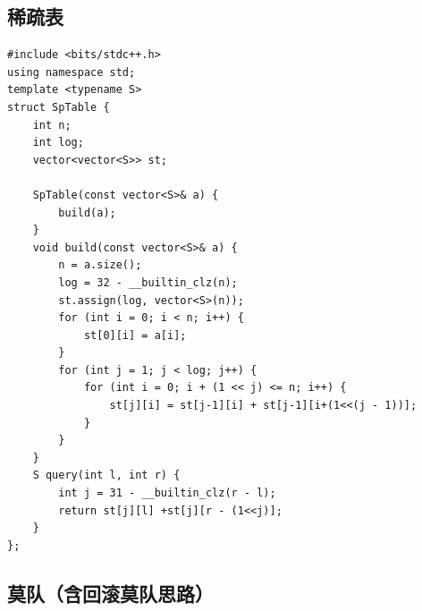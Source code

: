 \subsection{稀疏表}

\begin{lstlisting}
#include <bits/stdc++.h>
using namespace std;
template <typename S>
struct SpTable {
    int n;
    int log;
    vector<vector<S>> st;

    SpTable(const vector<S>& a) {
        build(a);
    }
    void build(const vector<S>& a) {
        n = a.size();
        log = 32 - __builtin_clz(n);
        st.assign(log, vector<S>(n));
        for (int i = 0; i < n; i++) {
            st[0][i] = a[i];
        }
        for (int j = 1; j < log; j++) {
            for (int i = 0; i + (1 << j) <= n; i++) {
                st[j][i] = st[j-1][i] + st[j-1][i+(1<<(j - 1))];
            }
        }
    }
    S query(int l, int r) {
        int j = 31 - __builtin_clz(r - l);
        return st[j][l] +st[j][r - (1<<j)];
    }
};
\end{lstlisting}

\subsection{莫队（含回滚莫队思路）}

